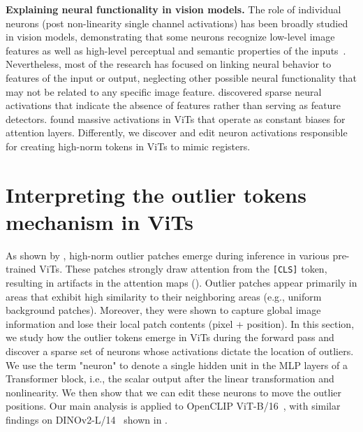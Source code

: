 \documentclass{article}
\begin{document}
\textbf{Explaining neural functionality in vision models.} The role of individual neurons (post non-linearity single channel activations) has been broadly studied in vision models, demonstrating that some neurons recognize low-level image features as well as high-level perceptual and semantic properties of the inputs~\citep{schwettmann2023multimodal,8099837,hernandez2021natural,gandelsman2024interpretingsecondordereffectsneurons,dravid2023rosetta}. Nevertheless, most of the research has focused on linking neural behavior to features of the input or output, neglecting other possible neural functionality that may not be related to any specific image feature. \cite{robinson2024sparse} discovered sparse neural activations that indicate the absence of features rather than serving as feature detectors. \cite{sunmassive} found massive activations in ViTs that operate as constant biases for attention layers. Differently, we discover and edit neuron activations responsible for creating high-norm tokens in ViTs to mimic registers. 

\section{Interpreting the outlier tokens mechanism in ViTs}
\label{sec:interpret_outliers}
As shown by \cite{darcet2024vision}, high-norm outlier patches emerge during inference in various pre-trained ViTs.  These patches strongly draw attention from the \texttt{[CLS]} token, resulting in artifacts in the attention maps (). Outlier patches appear primarily in areas that exhibit high similarity to their neighboring areas (e.g., uniform background patches). Moreover, they were shown to capture global image information and lose their local patch contents (pixel + position). In this section, we study how the outlier tokens emerge in ViTs during the forward pass and discover a sparse set of neurons whose activations dictate the location of outliers. We use the term "neuron" to denote a single hidden unit in the MLP layers of a Transformer block, i.e., the scalar output after the linear transformation and nonlinearity. We then show that we can edit these neurons to move the outlier positions. Our main analysis is applied to OpenCLIP ViT-B/16~\citep{openclip}, with similar findings on DINOv2-L/14~\citep{dinov2} shown in .

\end{document}
